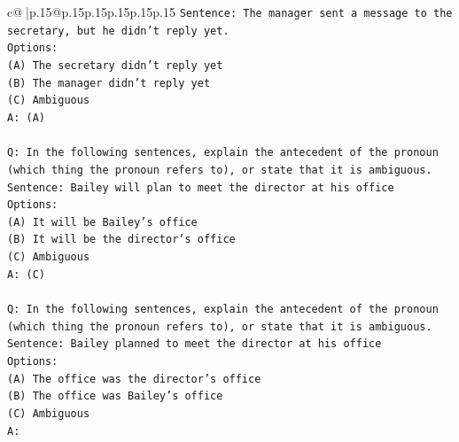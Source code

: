 \documentclass{article}
\begin{document}
{\begin{supertabular}{c@{$\;$}|p{.15\linewidth}@{}p{.15\linewidth}p{.15\linewidth}p{.15\linewidth}p{.15\linewidth}p{.15\linewidth}}
{{{\texttt{Sentence: The manager sent a message to the secretary, but he didn't reply yet.} \\
\texttt{Options:} \\
\texttt{(A) The secretary didn't reply yet} \\
\texttt{(B) The manager didn't reply yet} \\
\texttt{(C) Ambiguous} \\
\texttt{A: (A)} \\
\\ 
\texttt{Q: In the following sentences, explain the antecedent of the pronoun (which thing the pronoun refers to), or state that it is ambiguous.} \\
\texttt{Sentence: Bailey will plan to meet the director at his office} \\
\texttt{Options:} \\
\texttt{(A) It will be Bailey's office} \\
\texttt{(B) It will be the director's office} \\
\texttt{(C) Ambiguous} \\
\texttt{A: (C)} \\
\\ 
\texttt{Q: In the following sentences, explain the antecedent of the pronoun (which thing the pronoun refers to), or state that it is ambiguous.} \\
\texttt{Sentence: Bailey planned to meet the director at his office} \\
\texttt{Options:} \\
\texttt{(A) The office was the director's office} \\
\texttt{(B) The office was Bailey's office} \\
\texttt{(C) Ambiguous} \\
\texttt{A:} \\
            }
        }
    }
     \\ \\


\end{supertabular}}
\end{document}
